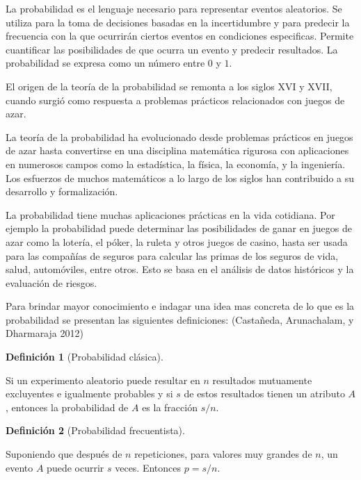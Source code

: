\documentclass[
  us-letterpaper,
]{scrreprt}
\theoremstyle{definition}
\newtheorem{definition}{Definición}[chapter]
\theoremstyle{plain}
\theoremstyle{plain}
\theoremstyle{remark}
\begin{document}
La probabilidad es el lenguaje necesario para representar eventos
aleatorios. Se utiliza para la toma de decisiones basadas en la
incertidumbre y para predecir la frecuencia con la que ocurrirán ciertos
eventos en condiciones especificas. Permite cuantificar las
posibilidades de que ocurra un evento y predecir resultados. La
probabilidad se expresa como un número entre \(0\) y \(1\).

El origen de la teoría de la probabilidad se remonta a los siglos XVI y
XVII, cuando surgió como respuesta a problemas prácticos relacionados
con juegos de azar.

La teoría de la probabilidad ha evolucionado desde problemas prácticos
en juegos de azar hasta convertirse en una disciplina matemática
rigurosa con aplicaciones en numerosos campos como la estadística, la
física, la economía, y la ingeniería. Los esfuerzos de muchos
matemáticos a lo largo de los siglos han contribuido a su desarrollo y
formalización.

La probabilidad tiene muchas aplicaciones prácticas en la vida
cotidiana. Por ejemplo la probabilidad puede determinar las
posibilidades de ganar en juegos de azar como la lotería, el póker, la
ruleta y otros juegos de casino, hasta ser usada para las compañías de
seguros para calcular las primas de los seguros de vida, salud,
automóviles, entre otros. Esto se basa en el análisis de datos
históricos y la evaluación de riesgos.

Para brindar mayor conocimiento e indagar una idea mas concreta de lo
que es la probabilidad se presentan las siguientes definiciones:
(Castañeda, Arunachalam, y Dharmaraja 2012)

\begin{definition}[Probabilidad
clásica]\protect\hypertarget{def-pclas}{}\label{def-pclas}

Si un experimento aleatorio puede resultar en \(n\) resultados
mutuamente excluyentes e igualmente probables y si \(s\) de estos
resultados tienen un atributo \(A\), entonces la probabilidad de \(A\)
es la fracción \(s/n\).

\end{definition}

\begin{definition}[Probabilidad
frecuentista]\protect\hypertarget{def-pfrec}{}\label{def-pfrec}

Suponiendo que después de \(n\) repeticiones, para valores muy grandes
de \(n\), un evento \(A\) puede ocurrir \(s\) veces. Entonces \(p=s/n\).

\end{definition}
\end{document}
